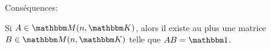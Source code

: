 Conséquences:
\begin{lemma}        \label{LEMooGZCTooQigDvC}
    Si \( A\in \eM(n,\eK)\), alors il existe au plus une matrice \( B\in \eM(n,\eK)\) telle que \( AB=\mtu\).
\end{lemma}
%
%
%
%

%

